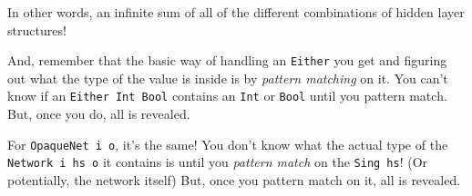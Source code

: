 \documentclass[]{article}
\begin{document}
In other words, an infinite sum of all of the different combinations of hidden
layer structures!

And, remember that the basic way of handling an \texttt{Either} you get and
figuring out what the type of the value is inside is by \emph{pattern matching}
on it. You can't know if an \texttt{Either\ Int\ Bool} contains an \texttt{Int}
or \texttt{Bool} until you pattern match. But, once you do, all is revealed.

For \texttt{OpaqueNet\ i\ o}, it's the same! You don't know what the actual type
of the \texttt{Network\ i\ hs\ o} it contains is until you \emph{pattern match}
on the \texttt{Sing\ hs}! (Or potentially, the network itself) But, once you
pattern match on it, all is revealed.
\end{document}
